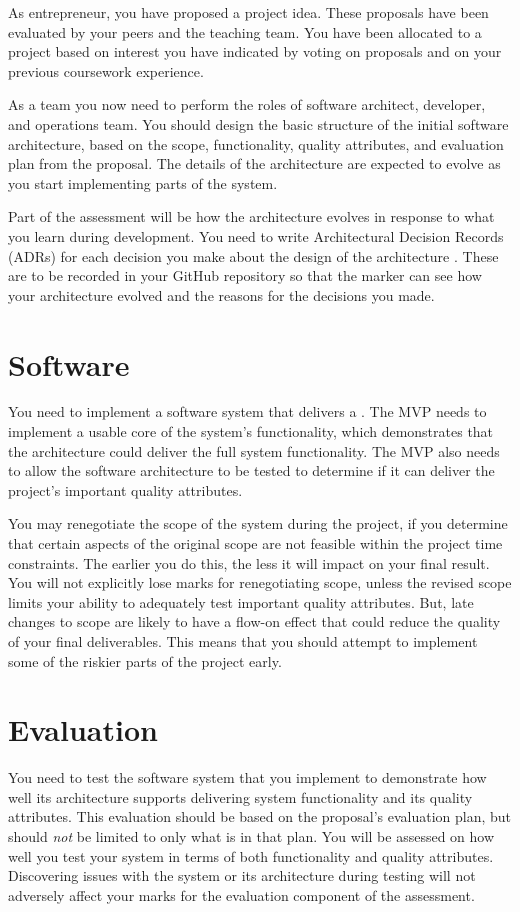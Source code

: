 \documentclass{csse4400}
\begin{document}
As entrepreneur, you have proposed a project idea.
These proposals have been evaluated by your peers and the teaching team.
You have been allocated to a project based on interest you have indicated by voting on proposals and on your previous coursework experience.

As a team you now need to perform the roles of software architect, developer, and operations team.
You should design the basic structure of the initial software architecture,
based on the scope, functionality, quality attributes, and evaluation plan from the proposal.
The details of the architecture are expected to evolve as you start implementing parts of the system.

Part of the assessment will be how the architecture evolves in response to what you learn during development.
You need to write Architectural Decision Records (ADRs) for each decision you make about the design of the architecture \cite{adr-notes}.
These are to be recorded in your GitHub repository so that the marker can see how your architecture evolved and the reasons for the decisions you made.


\section{Software}
You need to implement a software system that delivers a .
The MVP needs to implement a usable core of the system's functionality,
which demonstrates that the architecture could deliver the full system functionality.
The MVP also needs to allow the software architecture to be tested to determine if it can deliver the project's important quality attributes.

You may renegotiate the scope of the system during the project,
if you determine that certain aspects of the original scope are not feasible within the project time constraints.
The earlier you do this, the less it will impact on your final result.
You will not explicitly lose marks for renegotiating scope, unless the revised scope limits your ability to adequately test important quality attributes.
But, late changes to scope are likely to have a flow-on effect that could reduce the quality of your final deliverables.
This means that you should attempt to implement some of the riskier parts of the project early.


\section{Evaluation}
You need to test the software system that you implement to demonstrate
how well its architecture supports delivering system functionality and its quality attributes.
This evaluation should be based on the proposal's evaluation plan, but should \emph{not} be limited to only what is in that plan.
You will be assessed on how well you test your system in terms of both functionality and quality attributes.
Discovering issues with the system or its architecture during testing will not adversely affect your marks for the evaluation component of the assessment.
\end{document}
